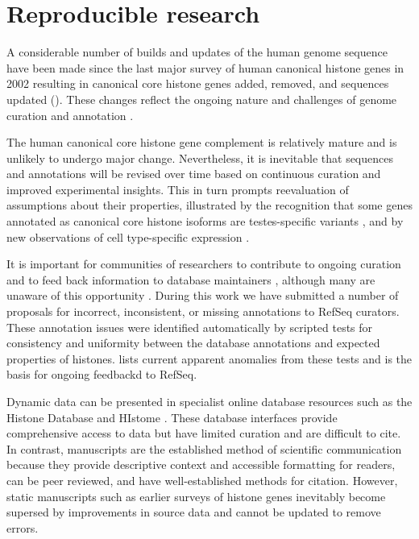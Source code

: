 \section{Reproducible research}

  A considerable number of builds and updates of the human genome sequence have been made
  since the last major survey of human canonical histone genes in 2002 \citep{Marzluff02}
  resulting in
  \AddedSinceReference{} canonical core histone genes added,
  \RemovedSinceReference{} removed,
  and \SequencesUpdatedSinceReference{}
  sequences updated ().
  These changes reflect the ongoing nature and challenges of
  genome curation and annotation \citep{BorkKoonin1998}.

  The human canonical core histone gene complement is relatively mature
  and is unlikely to undergo major change.
  Nevertheless, it is inevitable that sequences and annotations will be revised over time
  based on continuous curation and improved experimental insights.
  This in turn prompts reevaluation of assumptions about their properties,
  illustrated by the recognition that some genes
  annotated as canonical core histone isoforms are testes-specific variants \citep{Talbert2012},
  and by new observations of cell type-specific expression \citep{Molden2015}.

  It is important for communities of researchers to contribute
  to ongoing curation and to feed back information to database maintainers \citep{SteinNRG2001},
  although many are unaware of this opportunity \citep{HollidaySPR2015}.
  During this work we have submitted a number of proposals
  for incorrect, inconsistent, or missing annotations to RefSeq curators.
  These annotation issues were identified automatically
  by scripted tests for consistency and uniformity
  between the database annotations and expected properties of histones.
   lists current apparent anomalies from these tests
  and is the basis for ongoing feedbackd to RefSeq.

  Dynamic data can be presented in specialist online database resources
  such as the Histone Database \citep{HistoneDB2016} and HIstome \citep{HIstome2012}.
  These database interfaces provide comprehensive access to data
  but have limited curation and are difficult to cite.
  In contrast, manuscripts are the established method of scientific communication
  because they provide descriptive context and accessible formatting for readers,
  can be peer reviewed, and have well-established methods for citation.
  However, static manuscripts such as earlier surveys of histone genes \citep{AlbigHumangen1997,Marzluff02}
  inevitably become supersed by improvements in source data and cannot be updated to remove errors.

